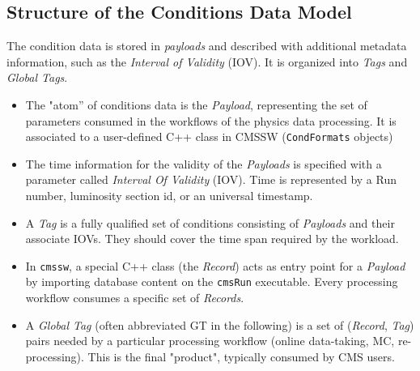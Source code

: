 \subsection{Structure of the Conditions Data Model}

The condition data is stored in \emph{payloads} and described with additional metadata information, such as the \emph{Interval of
Validity} (IOV). It is organized into \emph{Tags} and \emph{Global Tags}.
\begin{itemize}
\item The "atom” of conditions data is the \emph{Payload}, representing the set of parameters consumed in the workflows of the physics data processing. It is associated to a user-defined C++ class in CMSSW (\texttt{CondFormats} objects)
\item The time information for the validity of the \emph{Payloads} is specified with a parameter called \emph{Interval Of Validity} (IOV). Time is represented by a Run number, luminosity section id, or an universal timestamp.

\item A \emph{Tag} is a fully qualified set of conditions consisting of
\emph{Payloads} and their associate IOVs. They should cover the time span required by the workload. 
\item In \texttt{cmssw}, a special C++ class (the \emph{Record}) acts as entry point for a \emph{Payload} by importing database content on the \texttt{cmsRun} executable. Every processing workflow consumes a specific set of \emph{Records}.
\item A \emph{Global Tag} (often abbreviated GT in the following) is a set of (\emph{Record}, \emph{Tag}) pairs needed by a particular processing workflow (online data-taking, MC,
re-processing). This is the final "product", typically consumed by
CMS users.
\end{itemize}


